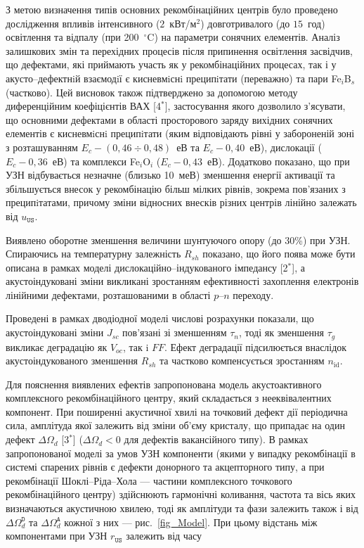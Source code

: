 З метою визначення типів основних рекомбінаційних центрів
було проведено дослідження впливів інтенсивного ($2$~кВт/м$^2$) довготривалого (до  $15$~год) освітлення
та відпалу (при 200~$^\circ$C) на параметри сонячних елементів.
Аналіз залишкових змін та перехідних процесів після припинення освітлення засвідчив, що дефектами, які приймають участь як у рекомбінаційних процесах, так і у акусто--дефектнiй взаємодiї є кисневмiснi преципiтати (переважно) та
пари Fe$_i$B$_s$ (частково).
Цей висновок також підтверджено за допомогою методу диференційним коефіцієнтів ВАХ
[4$^*$],
застосування якого дозволило з'ясувати, що основними дефектами в області просторового заряду вихідних сонячних елементів є кисневмiснi преципiтати  (яким відповідають рівні у забороненій зоні з розташуванням  $E_c-(0,46\div0,48)$~еВ та $E_c-0,40$~еВ), дислокації ($E_c-0,36$~еВ) та комплекси Fe$_i$O$_i$ ($E_c-0,43$~еВ).
Додатково показано, що
при УЗН відбувається незначне (близько 10~меВ) зменшення енергії активації та збільшується внесок
у рекомбінацію більш мілких рівнів, зокрема пов'язаних з преципiтатами, причому зміни відносних внесків різних центрів лінійно залежать від $u_\mathtt{US}$.

Виявлено оборотне зменшення величини шунтуючого опору (до 30\%) при УЗН.
Спираючись на температурну залежність $R_{sh}$ показано, що його поява може бути описана в рамках моделі дислокаційно--індукованого імпедансу
[2$^*$], а акустоіндуковані зміни викликані зростанням ефективності захоплення електронів лінійними дефектами, розташованими в області $p$--$n$ переходу.

Проведені в рамках дводіодної моделі числові розрахунки показали, що акустоіндуковані зміни $J_{sc}$ пов'язані зі зменшенням $\tau_{n}$,
тоді як зменшення $\tau_{g}$ викликає деградацію як $V_{oc}$, так i $F\!F$.
Ефект деградації підсилюється внаслідок акустоіндукованого зменшення $R_{sh}$ та частково компенсується зростанням $n_\mathrm{id}$.

Для пояснення виявлених ефектів запропонована модель акустоактивного комплексного рекомбінаційного центру, який складається з нееквівалентних компонент.
При поширенні акустичної хвилі на точковий дефект дії періодична сила, амплітуда якої залежить від зміни об'єму кристалу, що припадає на один дефект $\Delta\Omega_d$
[3$^*$] ($\Delta\Omega_d<0$ для дефектів вакансійного типу).
В рамках запропонованої моделі за умов УЗН компоненти (якими у випадку рекомбінації в системі спарених рівнів є  дефекти донорного та акцепторного типу, а при рекомбінації Шоклі--Ріда--Хола --- частини комплексного точкового рекомбінаційного центру) здійснюють гармонічні коливання, частота та вісь яких
визначаються акустичною хвилею, тоді як амплітуди та фази залежить також і від  $\Delta\Omega_d^\mathtt{D}$ та
$\Delta\Omega_d^\mathtt{A}$ кожної з них --- рис.~\ref{fig_Model}.
При цьому відстань між компонентами при УЗН $r_\mathtt{US}$ залежить від часу

